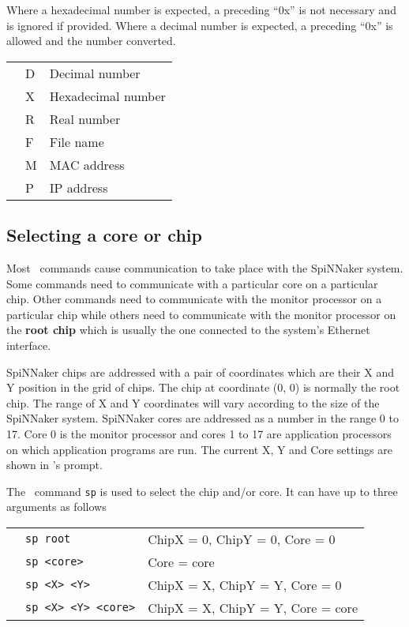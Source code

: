Where a hexadecimal number is expected, a preceding ``0x'' is not
necessary and is ignored if provided. Where a decimal number is
expected, a preceding ``0x'' is allowed and the number converted.

\begin{tabular}{p{0.5cm} p{0.5cm} l}
& D & Decimal number \\
& X & Hexadecimal number \\
& R & Real number \\
& F & File name \\
& M & MAC address \\
& P & IP address \\
\end{tabular}

\subsection{Selecting a core or chip}

Most \ybug\ commands cause communication to take place with the
SpiNNaker system. Some commands need to communicate with a particular
core on a particular chip. Other commands need to communicate with the
monitor processor on a particular chip while others need to
communicate with the monitor processor on the \textbf{root chip} which
is usually the one connected to the system's Ethernet interface.

SpiNNaker chips are addressed with a pair of coordinates which are
their X and Y position in the grid of chips. The chip at coordinate
(0, 0) is normally the root chip. The range of X and Y coordinates
will vary according to the size of the SpiNNaker system.  SpiNNaker cores
are addressed as a number in the range 0 to 17.  Core 0 is the
monitor processor and cores 1 to 17 are application processors on
which application programs are run. The current X, Y and Core settings
are shown in \ybug's prompt.

The \ybug\ command \texttt{sp} is used to select the chip and/or core.
It can have up to three arguments as follows

\begin{tabular}{p{0.5cm} p{5cm} l}
& \texttt{sp root} & ChipX = 0, ChipY = 0, Core = 0 \\
& \texttt{sp <core>} & Core = core \\
& \texttt{sp <X> <Y>} & ChipX = X, ChipY = Y, Core = 0 \\
& \texttt{sp <X> <Y> <core>} & ChipX = X, ChipY = Y, Core = core \\
\end{tabular}

